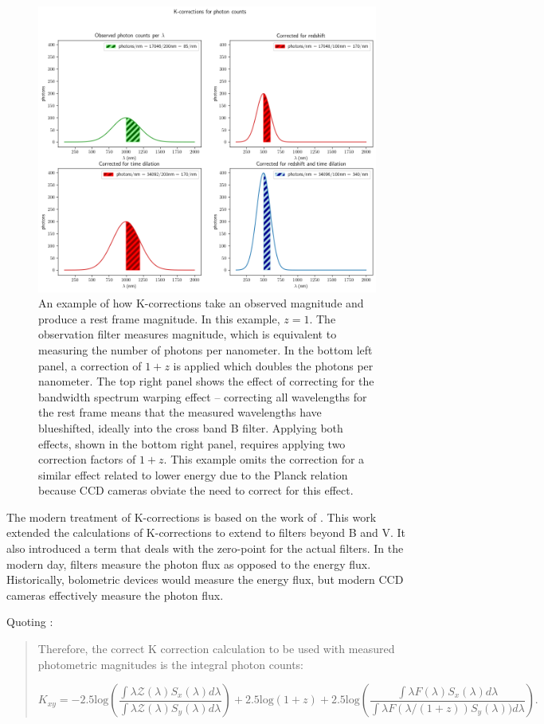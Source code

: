 \documentclass{article}
\begin{document}
\begin{figure}[H]
  \includegraphics[width=.75\linewidth]{K-corrections_for_photon_counts.png}
  \caption{An example of how K-corrections take an observed magnitude and
  produce a rest frame magnitude. In this example, $z=1$. The observation
  filter measures magnitude, which is equivalent to measuring the number of
  photons per nanometer. In the bottom left panel, a correction of $1+z$ is
  applied which doubles the photons per nanometer. The top right panel shows
  the effect of correcting for the bandwidth spectrum warping effect --
  correcting all wavelengths for the rest frame means that the measured
  wavelengths have blueshifted, ideally into the cross band B filter. Applying
  both effects, shown in the bottom right panel, requires applying two
  correction factors of $1+z$. This example omits the correction for a similar
  effect related to lower energy due to the Planck relation because CCD cameras
  obviate the need to correct for this effect.
  }
  \label{fig:k-example}
\end{figure}

The modern treatment of K-corrections is based on the work of \citet{kim1996}.
This work extended the calculations of K-corrections to extend to filters
beyond B and V. It also introduced a term that deals with the zero-point for
the actual filters. In the modern day, filters measure the photon flux as
opposed to the energy flux. Historically, bolometric devices would measure the
energy flux, but modern CCD cameras effectively measure the photon flux.

Quoting \citet{kim1996}:

\begin{quote}
  Therefore, the correct K correction calculation to be used with measured
  photometric magnitudes is the integral photon counts:

  \begin{equation}
  \label{eq:kim}
    K_{xy} =
      -2.5\text{log} \left(
        \frac{\int \lambda \mathcal{Z}(\lambda)S_x(\lambda)d\lambda}
             {\int \lambda \mathcal{Z}(\lambda)S_y(\lambda)d\lambda}\right)
      + 2.5\text{log}(1+z)
      + 2.5\text{log}\left(
        \frac{\int \lambda F(\lambda)S_x(\lambda)d\lambda}
             {\int \lambda F(\lambda/(1+z))S_y(\lambda))d\lambda}\right).
  \end{equation}
\end{quote}
\end{document}
